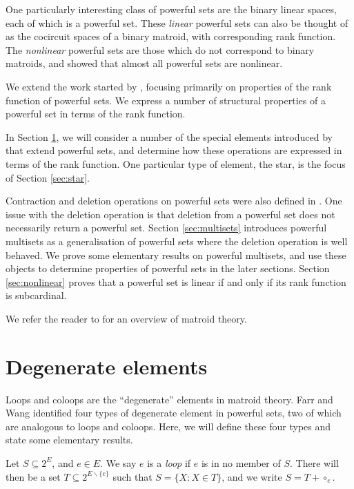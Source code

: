 \documentclass[10pt]{article}
\theoremstyle{definition}
\begin{document}
  One particularly interesting class of powerful sets are the binary linear spaces, each of which is a powerful set. These \emph{linear} powerful sets can also be thought of as the cocircuit spaces of a binary matroid, with corresponding rank function. The \emph{nonlinear} powerful sets are those which do not correspond to binary matroids, and \cite{farr2017} showed that almost all powerful sets are nonlinear. 
  
    We extend the work started by \cite{farr2017}, focusing primarily on properties of the rank function of powerful sets. We express a number of structural properties of a powerful set in terms of the rank function.
    
    In Section \ref{sec:extensions}, we will consider a number of the special elements introduced by \cite{farr2017} that extend powerful sets, and determine how these operations are expressed in terms of the rank function. One particular type of element, the star, is the focus of Section \ref{sec:star}.

    Contraction and deletion operations on powerful sets were also defined in \cite{farr2017}.
    One issue with the deletion operation is that deletion from a powerful set does not necessarily return a powerful set. Section \ref{sec:multisets} introduces powerful multisets as a generalisation of powerful sets where the deletion operation is well behaved. We prove some elementary results on powerful multisets, and use these objects to determine properties of powerful sets in the later sections. Section \ref{sec:nonlinear} proves that a powerful set is linear if and only if its rank function is subcardinal.
    
    We refer the reader to \cite{oxley92,welsh76} for an overview of matroid theory.
    
	\section{Degenerate elements}\label{sec:extensions}
	
  Loops and coloops are the ``degenerate'' elements in matroid theory. Farr and Wang \cite{farr2017} identified four types of degenerate element in powerful sets, two of which are analogous to loops and coloops. Here, we will define these four types and state some elementary results.
  

Let $S\subseteq 2^E$, and $e\in E$. We say $e$ is a \emph{loop} if $e$ is in no member of $S$. There will then be a set $T\subseteq 2^{E\backslash \{e\}}$ such that $S=\{X:X\in T\}$, and we write $S=T+\circ_e$.
	
\end{document}
